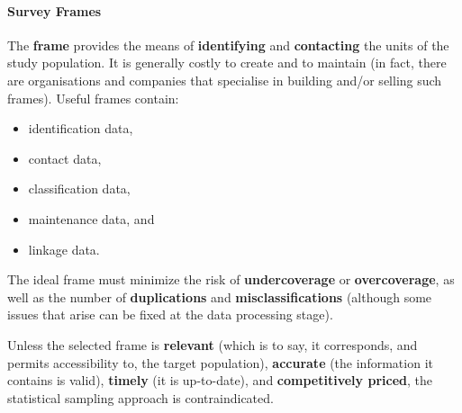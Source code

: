 \paragraph{Survey Frames} The \textbf{frame} provides the means of \textbf{identifying} and \textbf{contacting} the units of the study population. It is generally costly to create and to maintain (in fact, there are organisations and companies that specialise in building and/or selling such frames). Useful frames contain: 
\begin{itemize}[noitemsep]
\item identification data, 
\item contact data, 
\item classification data,
\item maintenance data, and 
\item linkage data.
\end{itemize} \newpage\noindent The ideal frame must minimize the risk of \textbf{undercoverage} or \textbf{overcoverage}, as well as the number of \textbf{duplications} and \textbf{misclassifications} (although some issues that arise can be fixed at the data processing stage).\par Unless the selected frame is \textbf{relevant} (which is to say, it corresponds, and permits accessibility to, the target population), \textbf{accurate} (the information it contains is valid), \textbf{timely} (it is up-to-date), and \textbf{competitively priced}, the statistical sampling approach is contraindicated. 
